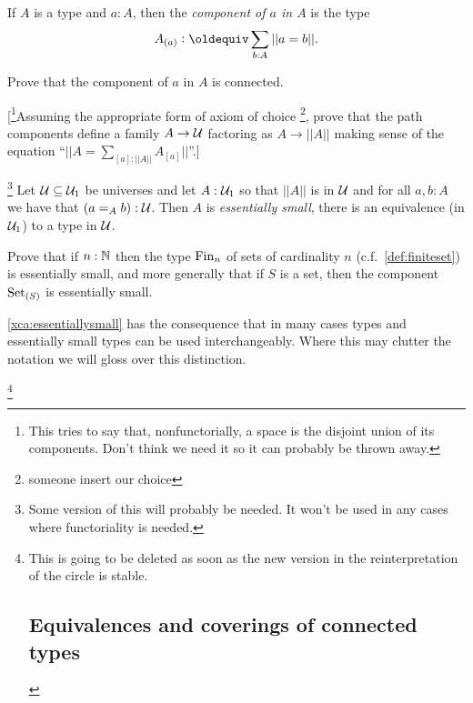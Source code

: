 {%

 
\begin{definition}
    If $A$ is a type and $a:A$, then the \emph{component of $a$ in $A$} is the type
$$A_{(a)}\defequi \sum_{b:A}||a=b||.$$
\end{definition}
\begin{xca}
  Prove that the component of $a$ in $A$ is connected.  

 [\footnote{This tries to say that, nonfunctorially, a space is the disjoint union of its components.  Don't think we need it so it can probably be thrown away.}Assuming the appropriate form of axiom of choice \footnote{someone insert our choice}, prove that the path components define a family $A\to\mathcal{U}$ factoring as $A\to||A||$ making sense of the equation ``$||A=\sum_{[a]:||A||}A_{[a]}||$''.]
\end{xca}
\begin{xca}\label{xca:essentiallysmall} \footnote{Some version of this will probably be needed.  It won't be used in any cases where functoriality is needed.}
  Let $\mathcal{U}\subseteq\mathcal{U}_1$ be universes and let $A:\mathcal{U}_1$ so that $||A||$ is in $\mathcal{U}$ and for all $a,b:A$ we have that $(a=_Ab):\mathcal{U}$.  Then $A$ is \emph{essentially small}, \ie there is an equivalence (in $\mathcal{U}_1$) to a type in $\mathcal{U}$.  

Prove that if $n:\mathbb{N}$ then the type $\operatorname{Fin}_n$ of sets of cardinality $n$  (c.f.~\cref{def:finiteset}) is essentially small, and more generally that if $S$ is a set, then the component $\mathord{\mathrm{Set}}_{(S)}$ is essentially small.  
\end{xca}
\cref{xca:essentiallysmall} has the consequence that in many cases types and essentially small types can be used interchangeably.  Where this may clutter the notation we will gloss over this distinction.

\footnote{This is going to be deleted as soon as the new version in the reinterpretation of the circle is stable.\tiny
\subsection{Equivalences and coverings of connected types}
\label{sec:eqconntypes}

}}
